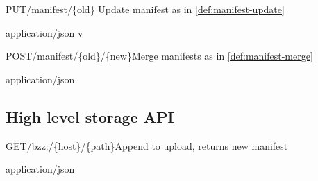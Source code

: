 \begin{apiRoute}{PUT}{/manifest/\{old\} }{Update manifest as in \ref{def:manifest-update}}
{
}
{ }

\begin{routeParameter} 
\end{routeParameter}
\begin{routeResponse}{application/json}
v
\end{routeResponse}
\end{apiRoute}




\begin{apiRoute}{POST}{/manifest/\{old\}/\{new\}}{Merge manifests as in \ref{def:manifest-merge}}
{
}
{ }

\begin{routeParameter} 
\end{routeParameter}
\begin{routeResponse}{application/json}
\end{routeResponse}
\end{apiRoute}

\subsection{High level storage API \statusyellow}\label{spec:api:manifest}


\begin{apiRoute}{GET}{/bzz:/\{host\}/\{path\}}{Append to upload, returns new manifest}
{
}
{ }

\begin{routeParameter} 
\end{routeParameter}
\begin{headerParameter} 
\end{headerParameter}
\begin{routeResponse}{application/json}
\end{routeResponse}
\end{apiRoute}



